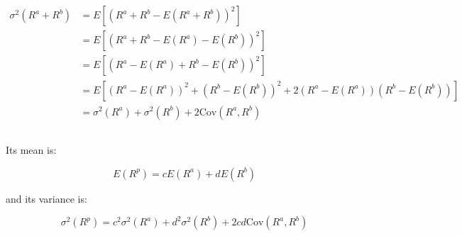 \subsection{}

\begin{align}
    \sigma^2(R^a + R^b) &= E[(R^a + R^b - E(R^a + R^b))^2] \\
    &= E[(R^a + R^b - E(R^a) - E(R^b))^2] \\
    &= E[(R^a - E(R^a) + R^b - E(R^b))^2] \\
    &= E[(R^a - E(R^a))^2 + (R^b - E(R^b))^2 + 2(R^a - E(R^a))(R^b - E(R^b))] \\
    &= \sigma^2(R^a) + \sigma^2(R^b) + 2\text{Cov}(R^a, R^b)
\end{align}

\subsection{}

Its mean is:

\begin{equation}
    E(R^p) = cE(R^a) + dE(R^b)
\end{equation}

and its variance is:

\begin{equation}
    \sigma^2(R^p) = c^2\sigma^2(R^a) + d^2\sigma^2(R^b) + 2cd\text{Cov}(R^a, R^b)
\end{equation}
